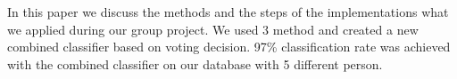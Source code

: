 In this paper we discuss the methods and the steps of the implementations what we applied during our group project. We used 3 method and created a new combined classifier based on voting decision. 97\% classification rate was achieved with the combined classifier on our database with 5 different person.